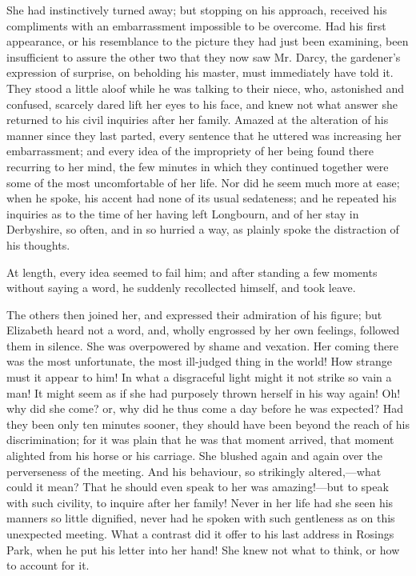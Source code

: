 \documentclass[12pt,openright]{book}
\begin{document}
She had instinctively turned away; but stopping on his approach, received his compliments with an embarrassment impossible to be overcome. Had his first appearance, or his resemblance to the picture they had just been examining, been insufficient to assure the other two that they now saw Mr. Darcy, the gardener’s expression of surprise, on beholding his master, must immediately have told it. They stood a little aloof while he was talking to their niece, who, astonished and confused, scarcely dared lift her eyes to his face, and knew not what answer she returned to his civil inquiries after her family. Amazed at the alteration of his manner since they last parted, every sentence that he uttered was increasing her embarrassment; and every idea of the impropriety of her being found there recurring to her mind, the few minutes in which they continued together were some of the most uncomfortable of her life. Nor did he seem much more at ease; when he spoke, his accent had none of its usual sedateness; and he repeated his inquiries as to the time of her having left Longbourn, and of her stay in Derbyshire, so often, and in so hurried a way, as plainly spoke the distraction of his thoughts.

At length, every idea seemed to fail him; and after standing a few moments without saying a word, he suddenly recollected himself, and took leave.

The others then joined her, and expressed their admiration of his figure; but Elizabeth heard not a word, and, wholly engrossed by her own feelings, followed them in silence. She was overpowered by shame and vexation. Her coming there was the most unfortunate, the most ill-judged thing in the world! How strange must it appear to him! In what a disgraceful light might it not strike so vain a man! It might seem as if she had purposely thrown herself in his way again! Oh! why did she come? or, why did he thus come a day before he was expected? Had they been only ten minutes sooner, they should have been beyond the reach of his discrimination; for it was plain that he was that moment arrived, that moment alighted from his horse or his carriage. She blushed again and again over the perverseness of the meeting. And his behaviour, so strikingly altered,—what could it mean? That he should even speak to her was amazing!—but to speak with such civility, to inquire after her family! Never in her life had she seen his manners so little dignified, never had he spoken with such gentleness as on this unexpected meeting. What a contrast did it offer to his last address in Rosings Park, when he put his letter into her hand! She knew not what to think, or how to account for it.
\end{document}
